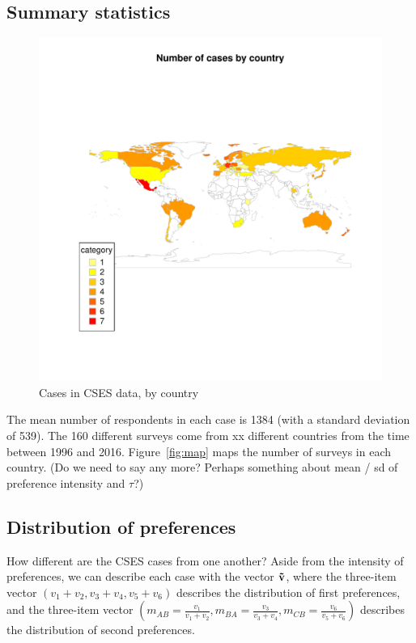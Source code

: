 \documentclass[12pt, letter]{article}
\begin{document}
\subsection{Summary statistics}

\begin{figure}[!htb]
	\centering
	\includegraphics[width = .5 \textwidth]{../output/figures/case_map.pdf}
	\caption{Cases in CSES data, by country}
	\label{fig:case_map}
\end{figure}

The mean number of respondents in each case is 1384 (with a standard deviation of 539). The 160 different surveys come from xx different countries from the time between 1996 and 2016. Figure~\ref{fig:map} maps the number of surveys in each country. (Do we need to say any more? Perhaps something about mean / sd of preference intensity and $\tau$?)

\subsection{Distribution of preferences} 

How different are the CSES cases from one another? Aside from the intensity of preferences, we can describe each case with the vector $\bf \tilde{v}$, where the three-item vector $(v_1 + v_2, v_3 + v_4, v_5 + v_6)$ describes the distribution of first preferences, and the three-item vector $(m_{AB} = \frac{v_1}{v_1 + v_2}, m_{BA} = \frac{v_3}{v_3 + v_4}, m_{CB} = \frac{v_6}{v_5 + v_6})$ describes the distribution of second preferences. 
\end{document}
